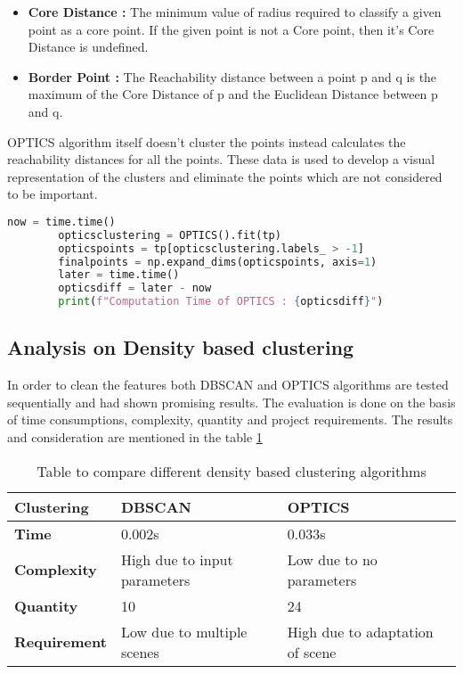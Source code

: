  \begin{itemize}
	\item \textbf{Core Distance :}  The minimum value of radius required to classify a given point as a core point. If the given point is not a Core point, then it’s Core Distance is undefined.
	\item \textbf{Border Point :} The Reachability distance between a point p and q is the maximum of the Core Distance of p and the Euclidean Distance between p and q.
\end{itemize}
 OPTICS algorithm itself doesn't cluster the points instead calculates the reachability distances for all the points. These data is used to develop a visual representation of the clusters and eliminate the points which are not considered to be important.
 
 \begin{lstlisting}[language=Python, frame=single, caption=Python code to compute OPTICS algorithm]
        now = time.time()
        opticsclustering = OPTICS().fit(tp)
        opticspoints = tp[opticsclustering.labels_ > -1]
        finalpoints = np.expand_dims(opticspoints, axis=1)
        later = time.time()
        opticsdiff = later - now
        print(f"Computation Time of OPTICS : {opticsdiff}")
\end{lstlisting}
 
 \subsection{Analysis on Density based clustering}
 In order to clean the features both DBSCAN and OPTICS algorithms are tested sequentially and had shown promising results. The evaluation is done on the basis of time consumptions, complexity, quantity and project requirements. The results and consideration are mentioned in the table \ref{table:2}
 
 \begin{table}[h!]
\centering
 \begin{tabular}{| p{3cm} || p{5cm} p{5cm} |} 
 \hline
 \textbf{Clustering} & \textbf{DBSCAN}  & \textbf{OPTICS}  \\
 \hline\hline
 \textbf{Time} & 0.002s & 0.033s \\
 \hline
 \textbf{Complexity} & High due to input parameters & Low due to no parameters \\
 \hline
 \textbf{Quantity} & 10 & 24 \\
 \hline
 \textbf{Requirement} & Low due to multiple scenes & High due to adaptation of scene \\
 \hline
\end{tabular}
\caption{Table to compare different density based clustering algorithms}
\label{table:2}
\end{table}
 
